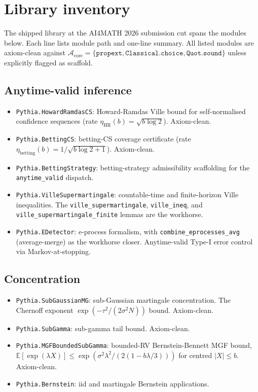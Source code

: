 \appendix

\section{Library inventory}
\label{sec:appendix-inventory}

The shipped library at the AI4MATH 2026 submission cut spans the
modules below. Each line lists module path and one-line summary.
All listed modules are axiom-clean against
$\mathcal{A}_{\text{core}} = \{\texttt{propext},
\texttt{Classical.choice}, \texttt{Quot.sound}\}$ unless explicitly
flagged as scaffold.

\subsection{Anytime-valid inference}
\begin{itemize}[leftmargin=1.3em,itemsep=0.2em]
\item \texttt{Pythia.HowardRamdasCS}: Howard-Ramdas Ville bound for
  self-normalised confidence sequences (rate
  $\eta_{\mathrm{HR}}(b) = \sqrt{b \log 2}$). Axiom-clean.
\item \texttt{Pythia.BettingCS}: betting-CS coverage certificate
  (rate $\eta_{\mathrm{betting}}(b) = 1/\sqrt{b\log 2 + 1}$).
  Axiom-clean.
\item \texttt{Pythia.BettingStrategy}: betting-strategy admissibility
  scaffolding for the \texttt{anytime\_valid} dispatch.
\item \texttt{Pythia.VilleSupermartingale}: countable-time and
  finite-horizon Ville inequalities. The
  \texttt{ville\_supermartingale}, \texttt{ville\_ineq}, and
  \texttt{ville\_supermartingale\_finite} lemmas are the workhorse.
\item \texttt{Pythia.EDetector}: e-process formalism, with
  \texttt{combine\_eprocesses\_avg} (average-merge) as the workhorse
  closer. Anytime-valid Type-I error control via Markov-at-stopping.
\end{itemize}

\subsection{Concentration}
\begin{itemize}[leftmargin=1.3em,itemsep=0.2em]
\item \texttt{Pythia.SubGaussianMG}: sub-Gaussian martingale
  concentration. The Chernoff exponent $\exp(-\tau^2/(2\sigma^2 N))$
  bound. Axiom-clean.
\item \texttt{Pythia.SubGamma}: sub-gamma tail bound. Axiom-clean.
\item \texttt{Pythia.MGFBoundedSubGamma}: bounded-RV
  Bernstein-Bennett MGF bound,
  $\mathbb{E}[\exp(\lambda X)]
   \leq \exp(\sigma^2 \lambda^2 / (2(1 - b\lambda/3)))$
  for centred $|X| \leq b$. Axiom-clean.
\item \texttt{Pythia.Bernstein}: iid and martingale Bernstein
  applications.
\end{itemize}

